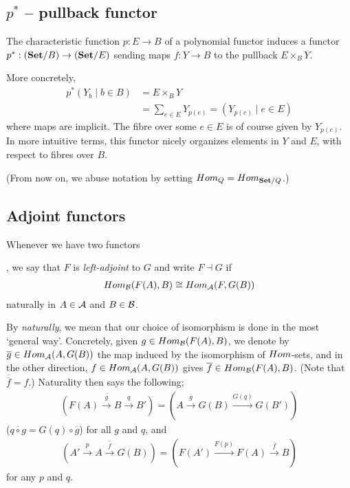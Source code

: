 \subsection{$p^*$ -- pullback functor}

The characteristic function $p:E\to B$ of a polynomial functor induces a functor $p^*:(\mathbf{Set}/ B)\to(\mathbf{Set}/ E)$ sending maps $f:Y\to B$ to the pullback $E\times_B Y$.

More concretely,
\begin{align*}
	p^* \left( Y_b \mid b\in B \right) &= E\times_B Y\\
		&= \sum_{e\in E} Y_{p(e)} = \left( Y_{p(e)} \mid e\in E \right)
\end{align*}
where maps are implicit. The fibre over some $e\in E$ is of course given by $Y_{p(e)}$. In more intuitive terms, this functor nicely organizes elements in $Y$ and $E$, with respect to fibres over $B$.

(From now on, we abuse notation by setting $Hom_Q = Hom_{\mathbf{Set}/Q}$.)


\subsection{Adjoint functors}

\begin{definition}
	Whenever we have two functors
	,
	we say that $F$ is \emph{left-adjoint} to $G$ and write $F \dashv G$ if
	\begin{align*}
		Hom_{\mathcal{B}}(F(A),B) \cong Hom_{\mathcal{A}}(F,G(B))
	\end{align*}
	naturally in $A\in\mathcal{A}$ and $B\in\mathcal{B}$.
\end{definition}

By \emph{naturally}, we mean that our choice of isomorphism is done in the most `general way'. Concretely, given $g\in Hom_{\mathcal{B}}(F(A),B)$, we denote by $\overline{g}\in Hom_{\mathcal{A}}(A,G(B))$ the map induced by the isomorphism of $Hom$-sets, and in the other direction, $f\in Hom_{\mathcal{A}}(A,G(B))$ gives $\overline{f}\in Hom_{\mathcal{B}}(F(A),B)$. (Note that $\overline{\overline{f}}=f$.) Naturality then says the following;
\begin{align*}
	\overline{\left(F(A) \overset{g}{\longrightarrow} B \overset{q}{\longrightarrow} B'\right)} = \left( A \overset{\overline{g}}{\longrightarrow} G(B) \overset{G(q)}{\longrightarrow} G(B') \right)
\end{align*} ($\overline{q\circ g} = G(q)\circ\overline{g}$) for all $g$ and $q$, and
\begin{align*}
	\overline{\left( A' \overset{p}{\longrightarrow} A \overset{f}{\longrightarrow} G(B) \right)} = \left( F(A') \overset{F(p)}{\longrightarrow} F(A) \overset{\overline{f}}{\longrightarrow} B \right)
\end{align*}
for any $p$ and $q$.

